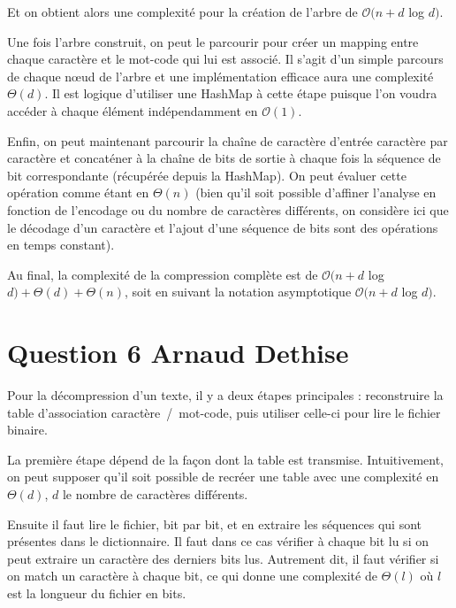 \documentclass[10pt,a4paper]{article}
\begin{document}
	Et on obtient alors une complexité pour la création de l'arbre de $\mathcal{O}(n + d $ log $ d)$.
	
	Une fois l'arbre construit, on peut le parcourir pour créer un mapping entre chaque caractère et le mot-code qui lui est associé. 
	Il s'agit d'un simple parcours de chaque nœud de l'arbre et une implémentation efficace aura une complexité $\Theta(d)$. 
	Il est logique d'utiliser une HashMap à cette étape puisque l'on voudra accéder à chaque élément indépendamment en $\mathcal{O}(1)$.
	
	Enfin, on peut maintenant parcourir la chaîne de caractère d'entrée caractère par caractère et concaténer à la chaîne de bits de sortie à chaque fois la séquence de bit correspondante (récupérée depuis la HashMap). 
	On peut évaluer cette opération comme étant en $\Theta(n)$ (bien qu'il soit possible  d'affiner l'analyse en fonction de l'encodage ou du nombre de caractères différents, on considère ici que le décodage d'un caractère et l'ajout d'une séquence de bits sont des opérations en temps constant).
	
	\vspace{0.3cm}
	Au final, la complexité de la compression complète est de $\mathcal{O}(n + d $ log $ d) + \Theta(d) + \Theta(n)$, soit en suivant la notation asymptotique $\mathcal{O}(n + d $ log $ d)$.
	

\section*{Question 6 Arnaud Dethise}

	Pour la décompression d'un texte, il y a deux étapes principales : reconstruire la table d'association caractère~/~mot-code, puis utiliser celle-ci pour lire le fichier binaire.
	
	La première étape dépend de la façon dont la table est transmise. Intuitivement, on peut supposer qu'il soit possible de recréer une table avec une complexité en $\Theta(d)$, $d$ le nombre de caractères différents.
	
	Ensuite il faut lire le fichier, bit par bit, et en extraire les séquences qui sont présentes dans le dictionnaire.
	Il faut dans ce cas vérifier à chaque bit lu si on peut extraire un caractère des derniers bits lus. Autrement dit, il faut vérifier si on match un caractère à chaque bit, ce qui donne une complexité de $\Theta(l)$ où $l$ est la longueur du fichier en bits.


\end{document}
